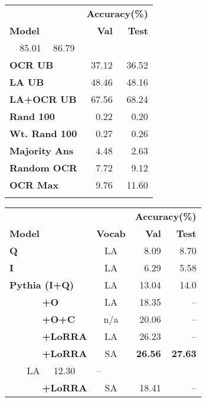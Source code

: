 \documentclass[10pt,twocolumn,letterpaper]{article}
\begin{document}
\begin{table}[t]
    \center
    \setlength{\tabcolsep}{0.5pt}
    \footnotesize
    
    \begin{tabular}{@{}lllr@{}r@{}}
    \toprule
    \multicolumn{3}{l}{} &  \multicolumn{2}{r}{\textbf{Accuracy(\%)}} \\
    \cmidrule{4-5}
    \multicolumn{3}{l}{\textbf{Model}} & \multicolumn{1}{r}{\textbf{Val}} & \multicolumn{1}{r}{\textbf{Test}}\\
    \addlinespace[0.5mm]
    \midrule
    \multicolumn{3}{l}{\textbf{Human}} & 85.01 & 86.79\\
    \multicolumn{3}{l}{\textbf{OCR UB}} & 37.12 & 36.52\\
    \multicolumn{3}{l}{\textbf{LA UB}} & 48.46 & 48.16\\
    \multicolumn{3}{l}{\textbf{LA+OCR UB}} & 67.56 & 68.24 \\
\multicolumn{3}{l}{\textbf{Rand 100}} & 0.22 & 0.20\\
    \multicolumn{3}{l}{\textbf{Wt. Rand 100}} & 0.27 & 0.26\\
    \multicolumn{3}{l}{\textbf{Majority Ans}} & 4.48 & 2.63\\
    \multicolumn{3}{l}{\textbf{Random OCR}} & 7.72 & 9.12\\
    \multicolumn{3}{l}{\textbf{OCR Max}} & 9.76 & 11.60\\
    \addlinespace[0.5mm]
    \bottomrule
    \end{tabular}
     \:
    \begin{tabular}{@{}llllr@{}r@{}}
    \toprule
    \multicolumn{3}{l}{} & \multicolumn{1}{c}{} & \multicolumn{2}{c}{\textbf{Accuracy(\%)}} \\
    \cmidrule{5-6}
    \multicolumn{3}{l}{\textbf{Model}} & \multicolumn{1}{c}{\textbf{Vocab}} & \multicolumn{1}{r}{\textbf{Val}} & \multicolumn{1}{r}{\textbf{Test}} \\
    \midrule
    \multicolumn{3}{l}{\textbf{Q}} & \multicolumn{1}{c}{LA} & 8.09 & 8.70\\
    \multicolumn{3}{l}{\textbf{I}} & \multicolumn{1}{c}{LA} & 6.29 & 5.58\\


    \multicolumn{3}{l}{\textbf{Pythia (I+Q)}}& \multicolumn{1}{c}{LA} & 13.04 & 14.0\\
    \multicolumn{3}{l}{\textbf{~~~~~~+O }}& \multicolumn{1}{c}{LA} & 18.35 & -- \\
    \multicolumn{3}{l}{\textbf{~~~~~~+O+C }}& \multicolumn{1}{c}{n/a} & 20.06 & --\\
    \multicolumn{3}{l}{\textbf{~~~~~~+LoRRA }}& \multicolumn{1}{c}{LA} & 26.23 & --\\
    \multicolumn{3}{l}{\textbf{~~~~~~+LoRRA }}& \multicolumn{1}{c}{SA} & \textbf{26.56} & \textbf{27.63}\\ \hline
    \addlinespace[1mm]
    \multicolumn{3}{l}{\textbf{BAN (I+Q)}}& \multicolumn{1}{c}{LA} & 12.30 & --\\
    \multicolumn{3}{l}{\textbf{~~~~~~+LoRRA }}& \multicolumn{1}{c}{SA} & 18.41 & --\\
    \bottomrule
    \end{tabular}
    

\end{table}
\end{document}
